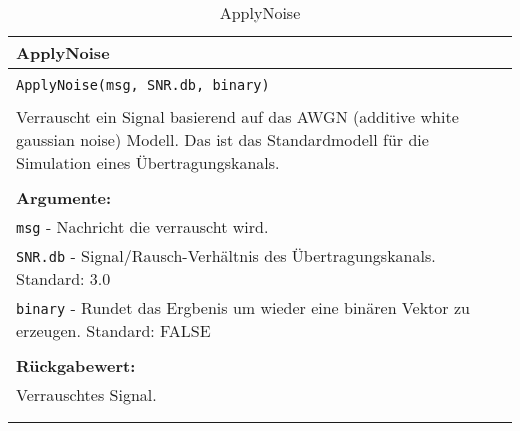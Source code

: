 \begin{longtable}{|p{\textwidth}|}
\hline
\rowcolor{lightblue}
ApplyNoise\\
\hline
\\
\texttt{ApplyNoise(msg, SNR.db, binary)}\\
\\
Verrauscht ein Signal basierend auf das AWGN (additive white gaussian noise) Modell. Das ist das Standardmodell für die Simulation eines Übertragungskanals.\\
\\
\textbf{Argumente:}\\
\texttt{msg} - Nachricht die verrauscht wird.\\
\texttt{SNR.db} - Signal/Rausch-Verhältnis des Übertragungskanals. Standard: 3.0\\
\texttt{binary} - Rundet das Ergbenis um wieder eine binären Vektor zu erzeugen. Standard: FALSE\\
\\
\textbf{Rückgabewert:}\\
Verrauschtes Signal.\\
\\
\hline
\caption{ApplyNoise}
\label{func:applynoise}
\end{longtable}